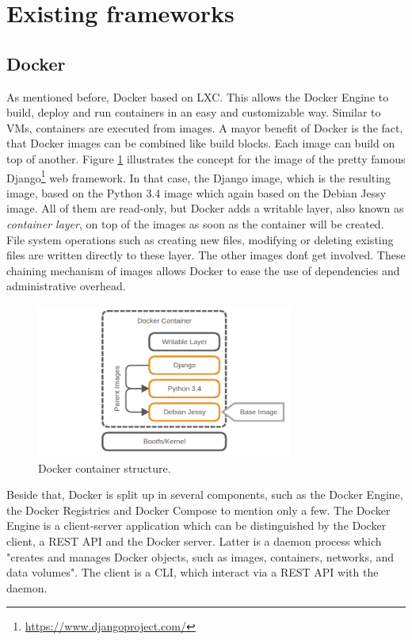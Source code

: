\section{Existing frameworks}

\subsection{Docker}
As mentioned before, Docker based on \ac{LXC}.
This allows the Docker Engine to build, deploy and run containers in an easy and customizable way.
Similar to \acp{VM}, containers are executed from images.
A mayor benefit of Docker is the fact, that Docker images can be combined like build blocks.
Each image can build on top of another.
Figure \ref{fig:docker_container_structure} illustrates the concept for the image of the pretty famous Django\footnote{\url{https://www.djangoproject.com/}} web framework.
In that case, the Django image, which is the resulting image, based on the Python 3.4 image which again based on the Debian Jessy image.
All of them are read-only, but Docker adds a writable layer, also known as \textit{container layer}, on top of the images as soon as the container will be created.
File system operations such as creating new files, modifying or deleting existing files are written directly to these layer.\cite[cf.]{dockerImages}
The other images don\'t get involved.
These chaining mechanism of images allows Docker to ease the use of dependencies and administrative overhead.

\begin{figure}[H]
    \centering
    \includegraphics[width=0.75\textwidth]{resources/images/docker_container_structure.png}
    \caption[Docker container structure]{Docker container structure.}
    \label{fig:docker_container_structure}
\end{figure}

Beside that, Docker is split up in several components, such as the Docker Engine, the Docker Registries and Docker Compose to mention only a few.
The Docker Engine is a client-server application which can be distinguished by the Docker client, a \ac{REST} \ac{API} and the Docker server.
Latter is a daemon process which "creates and manages Docker objects, such as images, containers, networks, and data volumes"\cite{dockerEngine}.
The client is a \ac{CLI}, which interact via a \ac{REST} \ac{API} with the daemon.\cite[cf.]{dockerEngine}

